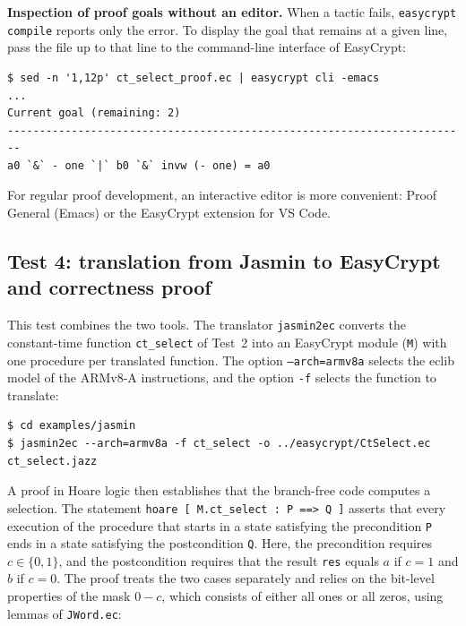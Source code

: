 \documentclass[11pt,a4paper]{article}
\newcommand{\file}[1]{\texttt{#1}}
\begin{document}
\begin{note}
\textbf{Inspection of proof goals without an editor.} When a tactic fails,
\texttt{easycrypt compile} reports only the error. To display the goal that
remains at a given line, pass the file up to that line to the command-line
interface of EasyCrypt:
\begin{lstlisting}[style=shell]
$ sed -n '1,12p' ct_select_proof.ec | easycrypt cli -emacs
...
Current goal (remaining: 2)
------------------------------------------------------------------------
a0 `&` - one `|` b0 `&` invw (- one) = a0
\end{lstlisting}
For regular proof development, an interactive editor is more convenient:
Proof General (Emacs) or the EasyCrypt extension for VS Code.
\end{note}

\subsection{Test 4: translation from Jasmin to EasyCrypt and correctness proof}
\label{sec:test4}

This test combines the two tools. The translator \texttt{jasmin2ec}
converts the constant-time function \texttt{ct\_select} of Test~2 into an
EasyCrypt module (\texttt{M}) with one procedure per translated function. The option
\texttt{--arch=armv8a} selects the eclib model of the ARMv8-A instructions,
and the option \texttt{-f} selects the function to translate:

\begin{lstlisting}[style=shell]
$ cd examples/jasmin
$ jasmin2ec --arch=armv8a -f ct_select -o ../easycrypt/CtSelect.ec ct_select.jazz
\end{lstlisting}



A proof in Hoare logic then establishes that the branch-free code computes a
selection. The statement \texttt{hoare [ M.ct\_select : P ==> Q ]} asserts
that every execution of the procedure that starts in a state satisfying the
precondition \texttt{P} ends in a state satisfying the postcondition
\texttt{Q}. Here, the precondition requires \(c \in \{0, 1\}\), and the
postcondition requires that the result \texttt{res} equals \(a\) if
\(c = 1\) and \(b\) if \(c = 0\). The proof treats the two cases separately
and relies on the bit-level properties of the mask \(0 - c\), which consists
of either all ones or all zeros, using lemmas of \file{JWord.ec}:
\end{document}
